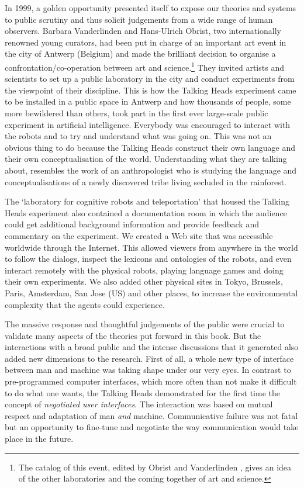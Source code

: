 In 1999, a golden opportunity presented itself to 
expose our theories and systems to public scrutiny and thus solicit
judgements from a wide range of human observers. Barbara
Vanderlinden and Hans-Ulrich Obrist, two internationally 
renowned young curators, had been put in charge of 
an important art event in the city of Antwerp (Belgium)
and made the brilliant decision to organise a 
confrontation/co-operation between art and 
science.\footnote{The catalog of this event, edited by Obrist and Vanderlinden \cite{Obrist:1999}, gives an idea of 
the other laboratories and the coming together of art and science.}
They invited 
artists and scientists to set up 
a public laboratory in the city and conduct experiments 
from the viewpoint of their discipline. This is how 
the Talking Heads experiment came to be installed in 
a public space in Antwerp and how thousands of people, 
some more bewildered than others, took part in the first
ever large-scale public experiment in artificial intelligence. 
Everybody was encouraged to interact with the robots and 
to try and understand what was going on. This was not an obvious
thing to do because the Talking Heads
construct their own language and their own conceptualisation of 
the world. Understanding what they are talking about, resembles the work 
of an anthropologist who is studying the language and
conceptualisations of a newly discovered tribe living
secluded in the rainforest. 

The `laboratory for cognitive robots and 
teleportation' that housed the 
Talking Heads experiment also contained  
a documentation room in which the audience could 
get additional background information and 
provide feedback and commentary 
on the experiment. We created a Web site that was accessible 
worldwide through the Internet. This allowed viewers from anywhere
in the world to follow the dialogs, inspect the lexicons
and ontologies 
of the robots, and even interact remotely with the 
physical robots, playing language games 
and doing their own experiments. We also added
other physical sites in Tokyo, Brussels, Paris, Amsterdam, 
San Jose (US) and other places, to increase the environmental complexity that 
the agents could experience. 

The massive response and thoughtful judgements of the 
public were crucial to validate many aspects of the 
theories put forward in this book. 
But the interactions with a broad public and
the intense discussions that it generated also added new
dimensions to the research. First of all, a whole 
new type of interface between man and machine was
taking shape under our very eyes. In contrast to pre-programmed
computer interfaces, which more often than not make it
difficult to do what one wants, the Talking Heads demonstrated
for the first time the concept of {\itshape negotiated user
interfaces}. The interaction was based on mutual respect
and adaptation of man {\itshape and} machine. Communicative
failure was not fatal but 
an opportunity to fine-tune and negotiate the way communication
would take place in the future. 

